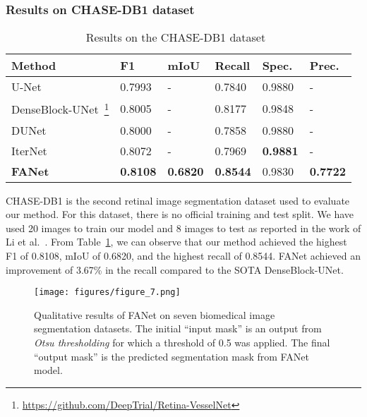 \documentclass[journal]{IEEEtran}
\begin{document}
\subsubsection{Results on CHASE-DB1 dataset}
\begin{table}[!t]
\footnotesize
\centering
\caption{Results on the CHASE-DB1 dataset~\cite{owen2009measuring}}
\vspace{0.1cm}
\begin{tabular}{@{}l|l|l|l|l|l@{}}
\toprule
\textbf{Method} & \textbf{F1} & \textbf{mIoU }& \textbf{Recall}& \textbf{Spec.} & \textbf{Prec.} \\ 
\hline
\hline
U-Net~\cite{ronneberger2015u} & 0.7993 & - & 0.7840 & 0.9880 & - \\ DenseBlock-UNet~\footnote{\url{https://github.com/DeepTrial/Retina-VesselNet}} & 0.8005 & - &0.8177 &0.9848 & - \\ DUNet~\cite{jin2019dunet} & 0.8000 & - &0.7858 &0.9880 & - \\ IterNet~\cite{li2020iternet} & 0.8072 & - &0.7969 & \textbf{0.9881} & -  \\ \textbf{FANet} & \textbf{0.8108} & \textbf{0.6820} & \textbf{0.8544} & 0.9830 & \textbf{0.7722} \\ \bottomrule
\end{tabular}
\label{tab:chaseDB}
\end{table}
CHASE-DB1 is the second retinal image segmentation dataset used to evaluate our method. For this dataset, there is no official training and test split. We have used 20 images to train our model and 8 images to test as reported in the work of Li et al.~\cite{li2020iternet}. From Table~\ref{tab:chaseDB}, we can observe that our method achieved the highest F1 of 0.8108, \ac{mIoU} of 0.6820, and the highest recall of 0.8544. FANet achieved an improvement of 3.67\% in the recall compared to the SOTA DenseBlock-UNet. 




\begin{figure}[t!]
    \centering
    \texttt{[image: figures/figure\_7.png]}
    \caption{Qualitative results of FANet on seven biomedical image segmentation datasets. The initial ``input mask'' is an output from \textit{Otsu thresholding} for which a threshold of 0.5 was applied. The final ``output mask'' is the predicted segmentation mask from FANet model.}
    \label{fig:qualitativeresult}
\end{figure}
\end{document}
